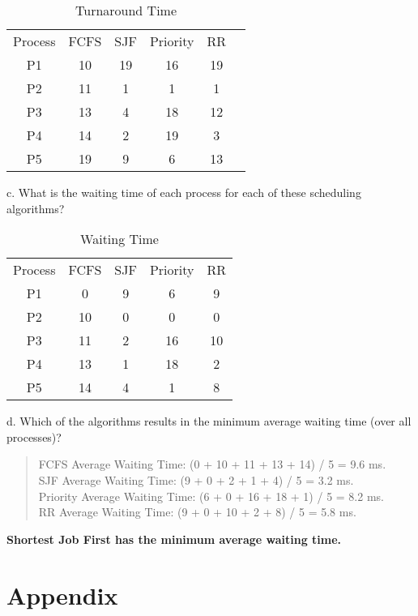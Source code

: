 \documentclass[letterpaper, 10pt,DIV=13]{scrartcl}
\numberwithin{equation}{section} %
\numberwithin{figure}{section} %
\numberwithin{table}{section} %
\begin{document}
\begin{table}[H]
    \centering
    \begin{tabular}{cccccc}
         Process&  FCFS&  SJF&  Priority&  RR& \\
         P1&  10&  19&  16&  19& \\
         P2&  11&  1&  1&  1& \\
         P3&  13&  4&  18&  12& \\
         P4&  14&  2&  19&  3& \\
         P5& 19&  9& 6& 13& \\
    \end{tabular}
    \caption{Turnaround Time}
    \label{tab:my_label}
\end{table}
c. What is the waiting time of each process for each of these scheduling algorithms? \\

\begin{table}[H]
    \centering
    \begin{tabular}{ccccc}
        Process & FCFS & SJF & Priority &RR \\
         P1&  0&  9&  6& 9\\
         P2&  10&  0&  0& 0\\
         P3&  11&  2&  16& 10\\
         P4&  13&  1&  18&2 \\
         P5&  14&  4&  1& 8\\
    \end{tabular}
    \caption{Waiting Time}
    \label{tab:my_label}
\end{table}
d. Which of the algorithms results in the minimum average waiting time (over all processes)?

\begin{quote}
    FCFS Average Waiting Time: (0 + 10 + 11 + 13 + 14) / 5 = 9.6 ms.\\
    SJF Average Waiting Time: (9 + 0 + 2 + 1 + 4) / 5 = 3.2 ms.\\
    Priority Average Waiting Time: (6 + 0 + 16 + 18 + 1) / 5 = 8.2 ms.\\
    RR Average Waiting Time: (9 + 0 + 10 + 2 + 8) / 5 = 5.8 ms.
\end{quote}
\textbf{Shortest Job First has the minimum average waiting time.} 




\pagebreak


\section{Appendix}
\end{document}
